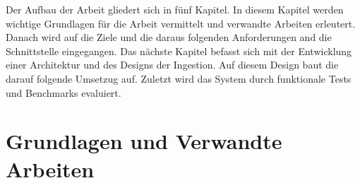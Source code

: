 Der Aufbau der Arbeit gliedert sich in fünf Kapitel.
In diesem Kapitel werden wichtige Grundlagen für die Arbeit vermittelt und verwandte Arbeiten erleutert.
Danach wird auf die Ziele und die daraus folgenden Anforderungen and die Schnittstelle eingegangen.
Das nächste Kapitel befasst sich mit der Entwicklung einer Architektur und des Designs der Ingestion.
Auf diesem Design baut die darauf folgende Umsetzug auf.
Zuletzt wird das System durch funktionale Tests und Benchmarks evaluiert.

\section{Grundlagen und Verwandte Arbeiten}









% 

